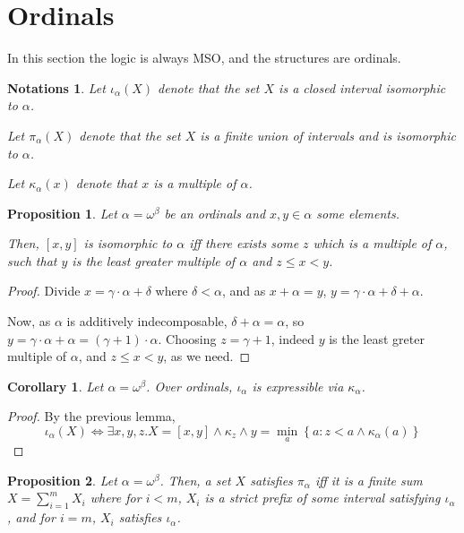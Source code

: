 \documentclass{article}
\newtheorem{corollary}{Corollary}
\newtheorem{proposition}{Proposition}
\newtheorem{notations}{Notations}
\newcommand{\parens}[1]{\left( {#1} \right)}
\newcommand{\brackets}[1]{\left[ {#1} \right]}
\newcommand{\braces}[1]{\left\{ {#1} \right\}}
\newcommand{\setcomp}[2]{\braces{{#1} : {#2}}}
\newcommand{\ii}[1]{{\iota}_{#1}}
\newcommand{\kk}[1]{{\kappa}_{#1}}
\newcommand{\pp}[1]{{\pi}_{#1}}
\begin{document}
\section{Ordinals}

In this section the logic is always MSO, and the structures are ordinals.

\begin{notations}
    Let $\ii{\alpha} \parens{X}$ denote
    that the set $X$ is a closed interval isomorphic to $\alpha$.

    Let $\pp{\alpha} \parens{X}$ denote
    that the set $X$ is a finite union of intervals and is isomorphic to $\alpha$.

    Let $\kk{\alpha} \parens{x}$ denote
    that $x$ is a multiple of $\alpha$.
\end{notations}


\begin{proposition}
    Let $\alpha = \omega^\beta$ be an ordinals
    and $x, y \in \alpha$ some elements.

    Then,
    $\brackets{x, y}$ is isomorphic to $\alpha$
    iff there exists some $z$ which is a multiple of $\alpha$,
    such that $y$ is the least greater multiple of $\alpha$ and $z \le x < y$.
\end{proposition}

\begin{proof}
    Divide $x = \gamma \cdot \alpha + \delta$ where $\delta < \alpha$, and as $x + \alpha = y$,
    $y = \gamma \cdot \alpha + \delta + \alpha$.

    Now, as $\alpha$ is additively indecomposable, $\delta + \alpha = \alpha$,
    so $y = \gamma \cdot \alpha + \alpha = \parens{\gamma + 1} \cdot \alpha$.
    Choosing $z = \gamma + 1$, indeed $y$ is the least greter multiple of $\alpha$,
    and $z \le x < y$, as we need.
\end{proof}

\begin{corollary}
    Let $\alpha = \omega^\beta$.
    Over ordinals, $\ii{\alpha}$ is expressible via $\kk{\alpha}$.
\end{corollary}

\begin{proof}
    By the previous lemma,
    $$\ii{\alpha} \parens{X}
    \iff
    \exists x, y, z. 
           X = \brackets{x, y}
    \wedge \kk{z}
    \wedge y = \min_a \setcomp{a}{z < a
    \wedge \kk{\alpha} \parens{a}}$$
\end{proof}

\begin{proposition}
    Let $\alpha = \omega^\beta$.
    Then, a set $X$ satisfies $\pp{\alpha}$ iff it is a finite sum
    $X = \sum_{i=1}^m X_i$ where for $i<m$, $X_i$ is a strict prefix
    of some interval satisfying $\ii{\alpha}$, and
    for $i = m$, $X_i$ satisfies $\ii{\alpha}$.
\end{proposition}
\end{document}
